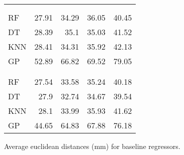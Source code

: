 \begin{margintable}
\begin{tabularx}{1\marginparwidth}{Xd{2.1}d{2.1}d{1.1}d{1.1}}
		&&    
		 &
		 &
		 \\
		\\
		\midrule
		RF & 27.91 & 34.29  & 36.05                      & 40.45 \\ 
		DT                  & 28.39                     & 35.1                       & 35.03  & 41.52 \\ 
		KNN                 & 28.41                     & 34.31                      & 35.92                      & 42.13 \\ 
		GP                  & 52.89                     & 66.82                      & 69.52                      & 79.05 \\ 
		\midrule
		&&    
		 &
		 &
		\\
		\\
		\midrule
		RF                  &27.54  & 33.58                       & 35.24                       & 40.18 \\ 
		DT &27.9                       & 32.74   & 34.67   & 39.54 \\ 
		KNN                 &28.1                       & 33.99                       & 35.93                       & 41.62 \\ 
		GP                  &44.65                      & 64.83                       & 67.88                       & 76.18 \\ 
		\bottomrule
	\end{tabularx}%
	\caption[Baseline data]{\small Average euclidean distances (mm) for baseline regressors.}
	\label{tab:baseline}
\end{margintable}

